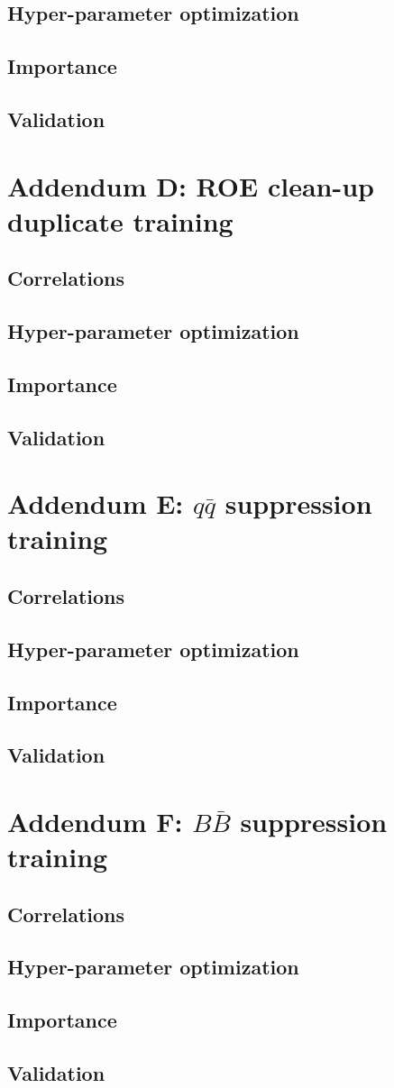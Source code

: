 \documentclass[  headings=standardclasses,
  headings=big,oneside,a4paper,openany,12pt]{scrbook}
\begin{document}
\section*{Hyper-parameter optimization}
\section*{Importance}
\section*{Validation}

\chapter*{Addendum D: ROE clean-up duplicate training}
\section*{Correlations}
\section*{Hyper-parameter optimization}
\section*{Importance}
\section*{Validation}

\chapter*{Addendum E: $q \bar q$ suppression training}
\section*{Correlations}
\section*{Hyper-parameter optimization}
\section*{Importance}
\section*{Validation}

\chapter*{Addendum F: $B \bar B$ suppression training}
\section*{Correlations}
\section*{Hyper-parameter optimization}
\section*{Importance}
\section*{Validation}
\end{document}
